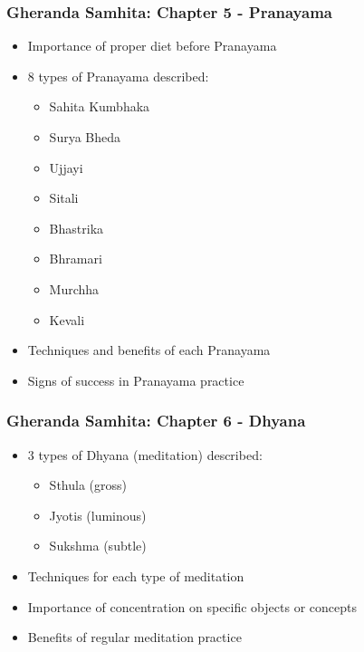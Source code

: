 \begin{frame}[fragile]\frametitle{Gheranda Samhita: Chapter 5 - Pranayama}
\begin{itemize}
    \item Importance of proper diet before Pranayama
    \item 8 types of Pranayama described:
    \begin{itemize}
        \item Sahita Kumbhaka
        \item Surya Bheda
        \item Ujjayi
        \item Sitali
        \item Bhastrika
        \item Bhramari
        \item Murchha
        \item Kevali
    \end{itemize}
    \item Techniques and benefits of each Pranayama
    \item Signs of success in Pranayama practice
\end{itemize}
\end{frame}

\begin{frame}[fragile]\frametitle{Gheranda Samhita: Chapter 6 - Dhyana}
\begin{itemize}
    \item 3 types of Dhyana (meditation) described:
    \begin{itemize}
        \item Sthula (gross)
        \item Jyotis (luminous)
        \item Sukshma (subtle)
    \end{itemize}
    \item Techniques for each type of meditation
    \item Importance of concentration on specific objects or concepts
    \item Benefits of regular meditation practice
\end{itemize}
\end{frame}

